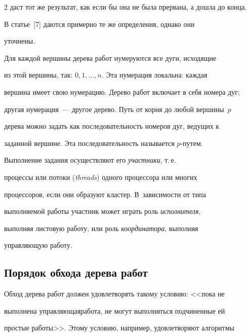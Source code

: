 \begin{multicols}{2}
даст тот же результат, как если бы она не была прервана, а дошла до конца. 


      


      В статье~[7] даются примерно те же определения, однако они 


уточнены.


      


      Для каждой вершины дерева работ нумеруются все дуги, исходящие 


из этой вершины, так: $0, 1, \ldots , n$. Эта нумерация локальна: каждая 


вершина имеет свою нумерацию. Дерево работ включает в себя номера дуг; 


другая нумерация~--- другое дерево. Путь от корня до любой вершины~$p$ 


дерева можно задать как последовательность номеров дуг, ведущих к 


заданной вершине. Эта последовательность называется $p$-пу\-тем.


      


      Выполнение задания осуществляют его \textit{участники}, т.\,е.\ 


процессы или потоки (\textit{threads}) одного процессора или многих 


процессоров, если они образуют кластер. В~зависимости от типа 


выполняемой работы участник может играть роль \textit{исполнителя}, 


выполняя листовую работу, или роль \textit{координатора}, выполняя 


управляющую работу. 





\subsection{Порядок обхода дерева работ}


      


      Обход дерева работ должен удовлетворять такому условию: <<пока не 


выполнена управляющая\linebreak работа, не могут выполняться подчиненные ей 


прос\-тые работы>>. Этому условию, например, удов\-ле\-тво\-ря\-ют алгоритмы 



\end{multicols}
